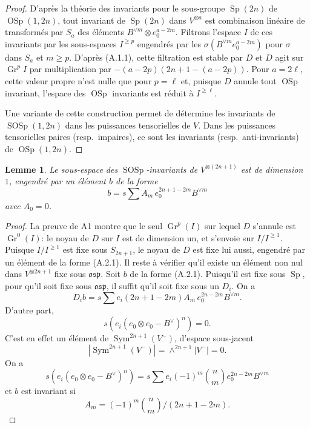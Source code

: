 \documentclass[11pt,a4paper]{article}
\theoremstyle{plain}
\newtheorem{lemma}[theorem]{Lemme}
\theoremstyle{definition}
\DeclareMathOperator{\Sym}{Sym}
\DeclareMathOperator{\Sp}{Sp}
\DeclareMathOperator{\OSp}{OSp}
\DeclareMathOperator{\SOSp}{SOSp}
\DeclareMathOperator{\Gr}{Gr}
\begin{document}
\begin{proof}
D'apr\`es la th\'eorie des invariants pour le sous-groupe $\Sp(2n)$ de $\OSp(1, 2n)$, tout invariant de $\Sp(2n)$ dans $V^{\otimes a}$ est combinaison lin\'eaire de transform\'es par $S_a$ des \'el\'ements $B^{\vee m} \otimes e_0^{a-2m}$. Filtrons l'espace $I$ de ces invariants par les sous-espaces $I^{\geq p}$ engendr\'es par les $\sigma(B^{\vee m} e_0^{a-2m})$ pour $\sigma$ dans $S_a$ et $m \geq p$. D'apr\`es (A.1.1), cette filtration est stable par $D$ et $D$ agit sur $\Gr^p I$ par multiplication par $-(a - 2p)(2n + 1 - (a - 2p))$. Pour $a = 2\ell$, cette valeur propre n'est nulle que pour $p = \ell$ et, puisque $D$ annule tout $\OSp$ invariant, l'espace des $\OSp$ invariants est r\'eduit \`a $I^{\geq \ell}$.

Une variante de cette construction permet de d\'etermine les invariants de $\SOSp(1, 2n)$ dans les puissances tensorielles de $V$. Dans les puissances tensorielles paires (resp.~impaires), ce sont les invariants (resp.~anti-invariants) de $\OSp(1, 2n)$.
\end{proof}

\begin{lemma}
Le sous-espace des $\SOSp$-invariants de $V^{\otimes (2n+1)}$ est de dimension $1$, engendr\'e par un \'el\'ement $b$ de la forme
\begin{equation}
b = s \sum A_m \, e_0^{2n+1-2m} B^{\vee m} \tag{A.2.1}
\end{equation}
avec $A_0 = 0$.
\end{lemma}

\begin{proof}
La preuve de A1 montre que le seul $\Gr^p(I)$ sur lequel $D$ s'annule est $\Gr^0(I)$: le noyau de $D$ sur $I$ est de dimension un, et s'envoie sur $I/I^{\geq 1}$. Puisque $I/I^{\geq 1}$ est fixe sous $S_{2n+1}$, le noyau de $D$ est fixe lui aussi, engendr\'e par un \'el\'ement de la forme (A.2.1). Il reste \`a v\'erifier qu'il existe un \'el\'ement non nul dans $V^{\otimes 2n+1}$ fixe sous $\mathfrak{osp}$. Soit $b$ de la forme (A.2.1). Puisqu'il est fixe sous $\Sp$, pour qu'il soit fixe sous $\mathfrak{osp}$, il suffit qu'il soit fixe sous un $D_i$. On a
\[
D_i b = s \sum e_i (2n + 1 - 2m) A_m \, e_0^{2n-2m} B^{\vee m}.
\]
D'autre part,
\[
s(e_i (e_0 \otimes e_0 - B^\vee)^n) = 0.
\]
C'est en effet un \'el\'ement de $\Sym^{2n+1}(V^-)$, d'espace sous-jacent
\[
|\Sym^{2n+1}(V^-)| = \wedge^{2n+1} |V^-| = 0.
\]
On a
\[
s(e_i (e_0 \otimes e_0 - B^\vee)^n) = s \sum e_i (-1)^m \binom{n}{m} e_0^{2n-2m} B^{\vee m}
\]
et $b$ est invariant si
\begin{equation}
A_m = (-1)^m \binom{n}{m} / (2n + 1 - 2m). \tag{A.2.2}
\end{equation}
\end{proof}
\end{document}
